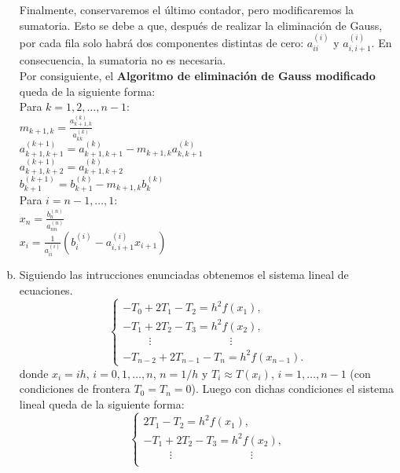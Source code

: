 \begin{homeworkProblem}
\begin{solucion}
\begin{enumerate}[a)]
        Finalmente, conservaremos el último contador, pero modificaremos la sumatoria. Esto se debe a que, después de realizar la eliminación de Gauss, por cada fila solo habrá dos componentes distintas de cero: $a_{ii}^{(i)}$ y $a_{i,i+1}^{(i)}$. En consecuencia, la sumatoria no es necesaria.\\
        Por consiguiente, el \textbf{Algoritmo de eliminación de Gauss modificado} queda de la siguiente forma:\\
          Para $k = 1, 2, \dotsc, n-1$: \\
          \phantom{Para} $m_{k+1,k} = \frac{a_{k+1,k}^{(k)}}{a_{kk}^{(k)}}$ \\
          \phantom{Para} $a_{k+1,k+1}^{(k+1)} = a_{k+1,k+1}^{(k)} - m_{k+1,k}a_{k,k+1}^{(k)}$ \\
          \phantom{Para} $a_{k+1,k+2}^{(k+1)} = a_{k+1,k+2}^{(k)}$ \\
          \phantom{Para} $b_{k+1}^{(k+1)} = b_{k+1}^{(k)} - m_{k+1,k}b_{k}^{(k)}$ \\
          Para $i = n-1, \dotsc, 1$: \\
          \phantom{Para} $x_n = \frac{b_n^{(n)}}{a_{nn}^{(n)}}$ \\
          \phantom{Para} $x_i = \frac{1}{a_{ii}^{(i)}}\left( b_i^{(i)} - a_{i,i+1}^{(i)}x_{i+1}\right)$
        \item Siguiendo las intrucciones enunciadas obtenemos el sistema lineal de ecuaciones.\\ 
          \[
            \begin{cases}
              -T_{0} + 2T_1 -T_2= h^2 f(x_1), \\
              -T_{1} + 2T_2 -T_3= h^2 f(x_2), \\
              \hspace{1cm} \vdots \hspace{3cm} \vdots \\
              -T_{n-2} + 2T_{n-1} -T_n= h^2 f(x_{n-1}).
            \end{cases}
          \]
          donde $x_i=ih$, $i=0, 1, \dotsc, n$, $n=1/h$ y  $T_i\approx T(x_i)$, $i=1, \dotsc, n-1$ (con condiciones de frontera $T_0=T_n=0$). Luego con dichas condiciones el sistema lineal queda de la siguiente forma:
          \[
            \begin{cases}
              2T_1 -T_2= h^2 f(x_1), \\
              -T_{1} + 2T_2 -T_3= h^2 f(x_2), \\
              \hspace{1cm} \vdots \hspace{3cm} \vdots \\

\end{cases}\]
\end{enumerate}
\end{solucion}
\end{homeworkProblem}
